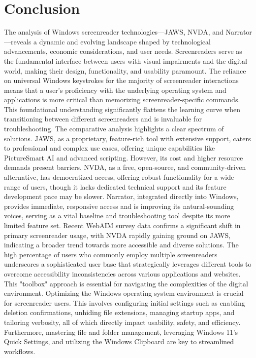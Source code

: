 \section{Conclusion}
The analysis of Windows screenreader technologies—JAWS, NVDA, and Narrator—reveals a dynamic and evolving landscape shaped by technological advancements, economic considerations, and user needs. Screenreaders serve as the fundamental interface between users with visual impairments and the digital world, making their design, functionality, and usability paramount.
The reliance on universal Windows keystrokes for the majority of screenreader interactions means that a user's proficiency with the underlying operating system and applications is more critical than memorizing screenreader-specific commands. This foundational understanding significantly flattens the learning curve when transitioning between different screenreaders and is invaluable for troubleshooting.
The comparative analysis highlights a clear spectrum of solutions. JAWS, as a proprietary, feature-rich tool with extensive support, caters to professional and complex use cases, offering unique capabilities like PictureSmart AI and advanced scripting. However, its cost and higher resource demands present barriers. NVDA, as a free, open-source, and community-driven alternative, has democratized access, offering robust functionality for a wide range of users, though it lacks dedicated technical support and its feature development pace may be slower. Narrator, integrated directly into Windows, provides immediate, responsive access and is improving its natural-sounding voices, serving as a vital baseline and troubleshooting tool despite its more limited feature set.
Recent WebAIM survey data confirms a significant shift in primary screenreader usage, with NVDA rapidly gaining ground on JAWS, indicating a broader trend towards more accessible and diverse solutions. The high percentage of users who commonly employ multiple screenreaders underscores a sophisticated user base that strategically leverages different tools to overcome accessibility inconsistencies across various applications and websites. This "toolbox" approach is essential for navigating the complexities of the digital environment.
Optimizing the Windows operating system environment is crucial for screenreader users. This involves configuring initial settings such as enabling deletion confirmations, unhiding file extensions, managing startup apps, and tailoring verbosity, all of which directly impact usability, safety, and efficiency. Furthermore, mastering file and folder management, leveraging Windows 11's Quick Settings, and utilizing the Windows Clipboard are key to streamlined workflows.
